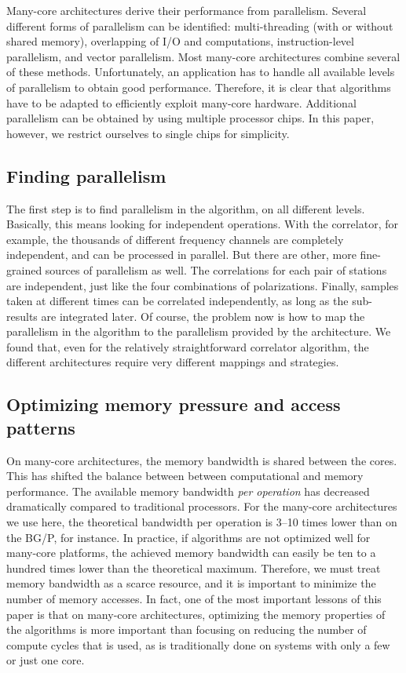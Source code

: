 \documentclass{article}
\begin{document}
Many-core architectures derive their performance from parallelism.
Several different forms of parallelism can be identified:
multi-threading (with or without shared memory), overlapping of I/O
and computations, instruction-level parallelism, and vector parallelism. Most
many-core architectures combine several of these methods.  
Unfortunately, an application has to handle all available levels of parallelism to
obtain good performance.
Therefore, it is clear that algorithms have to be adapted to efficiently exploit
many-core hardware.
Additional parallelism can be obtained by using multiple processor chips.
In this paper, however, we restrict ourselves to single chips for simplicity.



\subsection{Finding parallelism}

The first step is to find parallelism in the algorithm, on all
different levels.  Basically, this means looking for independent
operations.  With the correlator, for example, the thousands of
different frequency channels are completely independent, and can be
processed in parallel. But there are other, more fine-grained sources
of parallelism as well.  The correlations for each pair of stations
are independent, just like the four combinations of  
polarizations.  Finally, samples taken at different times can
be correlated independently, as long as the sub-results are integrated
later. Of course, the problem now is how to map the parallelism in the
algorithm to the parallelism provided by the architecture. We found
that, even for the relatively straightforward correlator algorithm,
the different architectures require very different mappings and
strategies.


\subsection{Optimizing memory pressure and access patterns}

On many-core architectures, the memory bandwidth is shared between the
cores.  This has shifted the balance between between computational and
memory performance.  The available memory bandwidth \emph{per operation} has
decreased dramatically compared to traditional processors.  For the
many-core architectures we use here, the theoretical bandwidth per operation is
3--10 times lower than on the BG/P, for instance. In practice, if algorithms
are not optimized well for many-core platforms, the achieved memory bandwidth can
easily be ten to a hundred times lower than the theoretical maximum.
Therefore, we must
treat memory bandwidth as a scarce resource, and it is important to
minimize the number of memory accesses.  In fact, one of the most
important lessons of this paper is that on many-core architectures,
optimizing the memory properties of the algorithms is more important
than focusing on reducing the number of compute cycles that is used,
as is traditionally done on systems with only a few or just one core.
\end{document}
